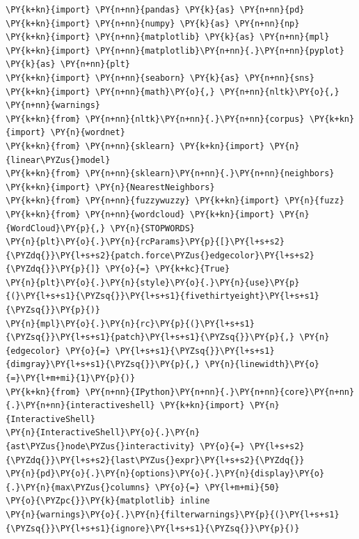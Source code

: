     \begin{tcolorbox}[breakable, size=fbox, boxrule=1pt, pad at break*=1mm,colback=cellbackground, colframe=cellborder]
\begin{Verbatim}[commandchars=\\\{\}]
\PY{k+kn}{import} \PY{n+nn}{pandas} \PY{k}{as} \PY{n+nn}{pd}
\PY{k+kn}{import} \PY{n+nn}{numpy} \PY{k}{as} \PY{n+nn}{np}
\PY{k+kn}{import} \PY{n+nn}{matplotlib} \PY{k}{as} \PY{n+nn}{mpl}
\PY{k+kn}{import} \PY{n+nn}{matplotlib}\PY{n+nn}{.}\PY{n+nn}{pyplot} \PY{k}{as} \PY{n+nn}{plt}
\PY{k+kn}{import} \PY{n+nn}{seaborn} \PY{k}{as} \PY{n+nn}{sns}
\PY{k+kn}{import} \PY{n+nn}{math}\PY{o}{,} \PY{n+nn}{nltk}\PY{o}{,} \PY{n+nn}{warnings}
\PY{k+kn}{from} \PY{n+nn}{nltk}\PY{n+nn}{.}\PY{n+nn}{corpus} \PY{k+kn}{import} \PY{n}{wordnet}
\PY{k+kn}{from} \PY{n+nn}{sklearn} \PY{k+kn}{import} \PY{n}{linear\PYZus{}model}
\PY{k+kn}{from} \PY{n+nn}{sklearn}\PY{n+nn}{.}\PY{n+nn}{neighbors} \PY{k+kn}{import} \PY{n}{NearestNeighbors}
\PY{k+kn}{from} \PY{n+nn}{fuzzywuzzy} \PY{k+kn}{import} \PY{n}{fuzz}
\PY{k+kn}{from} \PY{n+nn}{wordcloud} \PY{k+kn}{import} \PY{n}{WordCloud}\PY{p}{,} \PY{n}{STOPWORDS}
\PY{n}{plt}\PY{o}{.}\PY{n}{rcParams}\PY{p}{[}\PY{l+s+s2}{\PYZdq{}}\PY{l+s+s2}{patch.force\PYZus{}edgecolor}\PY{l+s+s2}{\PYZdq{}}\PY{p}{]} \PY{o}{=} \PY{k+kc}{True}
\PY{n}{plt}\PY{o}{.}\PY{n}{style}\PY{o}{.}\PY{n}{use}\PY{p}{(}\PY{l+s+s1}{\PYZsq{}}\PY{l+s+s1}{fivethirtyeight}\PY{l+s+s1}{\PYZsq{}}\PY{p}{)}
\PY{n}{mpl}\PY{o}{.}\PY{n}{rc}\PY{p}{(}\PY{l+s+s1}{\PYZsq{}}\PY{l+s+s1}{patch}\PY{l+s+s1}{\PYZsq{}}\PY{p}{,} \PY{n}{edgecolor} \PY{o}{=} \PY{l+s+s1}{\PYZsq{}}\PY{l+s+s1}{dimgray}\PY{l+s+s1}{\PYZsq{}}\PY{p}{,} \PY{n}{linewidth}\PY{o}{=}\PY{l+m+mi}{1}\PY{p}{)}
\PY{k+kn}{from} \PY{n+nn}{IPython}\PY{n+nn}{.}\PY{n+nn}{core}\PY{n+nn}{.}\PY{n+nn}{interactiveshell} \PY{k+kn}{import} \PY{n}{InteractiveShell}
\PY{n}{InteractiveShell}\PY{o}{.}\PY{n}{ast\PYZus{}node\PYZus{}interactivity} \PY{o}{=} \PY{l+s+s2}{\PYZdq{}}\PY{l+s+s2}{last\PYZus{}expr}\PY{l+s+s2}{\PYZdq{}}
\PY{n}{pd}\PY{o}{.}\PY{n}{options}\PY{o}{.}\PY{n}{display}\PY{o}{.}\PY{n}{max\PYZus{}columns} \PY{o}{=} \PY{l+m+mi}{50}
\PY{o}{\PYZpc{}}\PY{k}{matplotlib} inline
\PY{n}{warnings}\PY{o}{.}\PY{n}{filterwarnings}\PY{p}{(}\PY{l+s+s1}{\PYZsq{}}\PY{l+s+s1}{ignore}\PY{l+s+s1}{\PYZsq{}}\PY{p}{)}


\end{Verbatim}
\end{tcolorbox}
